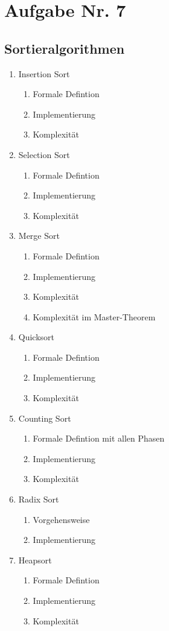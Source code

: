 \documentclass[12px,a4paper]{article}
\begin{document}
\section*{Aufgabe Nr. 7}
\subsection*{Sortieralgorithmen}
\begin{enumerate}
	\item Insertion Sort
	\begin{enumerate}
	\item Formale Defintion
	\item Implementierung 
	\item Komplexität
	\end{enumerate}
	\item Selection Sort
	\begin{enumerate}
	\item Formale Defintion
	\item Implementierung 
	\item Komplexität
	\end{enumerate}
	\item Merge Sort
	\begin{enumerate}
	\item Formale Defintion
	\item Implementierung 
	\item Komplexität
	\item Komplexität im Master-Theorem
	\end{enumerate}
	\item Quicksort
	\begin{enumerate}
	\item Formale Defintion
	\item Implementierung 
	\item Komplexität
	\end{enumerate}
	\item Counting Sort
	\begin{enumerate}
	\item Formale Defintion mit allen Phasen
	\item Implementierung 
	\item Komplexität
	\end{enumerate}
	\item Radix Sort
	\begin{enumerate}
	\item Vorgehensweise
	\item Implementierung 
	\end{enumerate}
	\item Heapsort
	\begin{enumerate}
	\item Formale Defintion
	\item Implementierung 
	\item Komplexität
	\end{enumerate}
\end{enumerate}
\newpage
\end{document}
